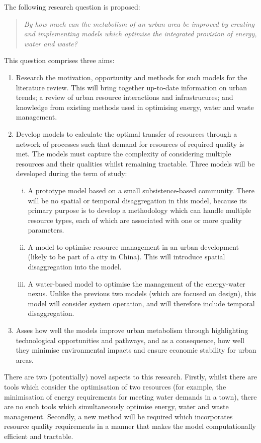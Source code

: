 The following research question is proposed:
\begin{quote}
	\emph{By how much can the metabolism of an urban area be improved by creating and implementing models which optimise the integrated provision of energy, water and waste?}
\end{quote}
This question comprises three aims:
\begin{enumerate}
	\item Research the motivation, opportunity and methods for such models for the literature review. This will bring together up-to-date information on urban trends; a review of urban resource interactions and infrastrucures; and knowledge from existing methods used in optimising energy, water and waste management.
	\item Develop models to calculate the optimal transfer of resources through a network of processes such that demand for resources of required quality is met. The models must capture the complexity of considering multiple resources and their qualities whilst remaining tractable. Three models will be developed during the term of study:
		\begin{enumerate}[(i)]
			\item A prototype model based on a small subsistence-based community. There will be no spatial or temporal disaggregation in this model, because its primary purpose is to develop a methodology which can handle multiple resource types, each of which are associated with one or more quality parameters.
			\item A model to optimise resource management in an urban development (likely to be part of a city in China). This will introduce spatial disaggregation into the model.
			\item A water-based model to optimise the management of the energy-water nexus. Unlike the previous two models (which are focused on design), this model will consider system operation, and will therefore include temporal disaggregation.
		\end{enumerate}
	\item Asses how well the models improve urban metabolism through highlighting technological opportunities and pathways, and as a consequence, how well they minimise environmental impacts and ensure economic stability for urban areas.
\end{enumerate}

There are two (potentially) novel aspects to this research. Firstly, whilst there are tools which consider the optimisation of two resources (for example, the minimisation of energy requirements for meeting water demands in a town), there are no such tools which simultaneously optimise energy, water and waste management. Secondly, a new method will be required which incorporates resource quality requirements in a manner that makes the model computationally efficient and tractable. 


